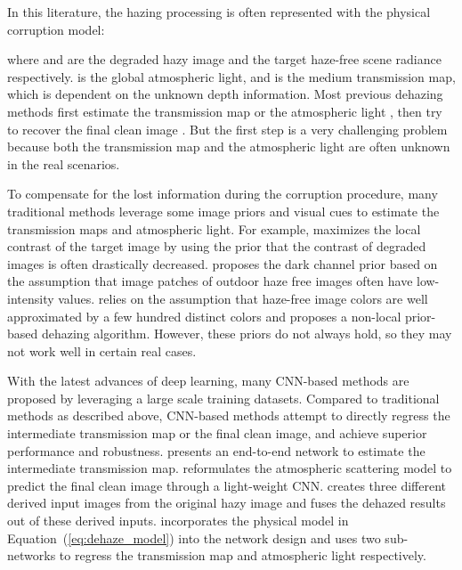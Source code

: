 \documentclass[10pt,twocolumn,letterpaper]{article}
\newcommand{\Eref}[1]{Equation~(\ref{#1})}
\begin{document}
In this literature, the hazing processing is often represented with the physical corruption model:

where  and  are the degraded hazy image and the target haze-free scene radiance respectively.  is the global atmospheric light, and  is the medium transmission map, which is dependent on the unknown depth information. Most previous dehazing methods first estimate the transmission map  or the atmospheric light ,  then try to recover the final clean image . But the first step is a very challenging problem because both the transmission map  and the atmospheric light  are often unknown in the real scenarios. 

To compensate for the lost information during the corruption procedure, many traditional methods \cite{berman2016non,hautiere2007towards,he2011single,meng2013efficient,pei2012nighttime,zhu2015fast} leverage some image priors and visual cues to estimate the transmission maps and atmospheric light. For example, \cite{hautiere2007towards} maximizes the local contrast of the target image by using the prior that the contrast of degraded images is often drastically decreased. \cite{he2011single} proposes the dark channel prior based on the assumption that image patches of outdoor haze free images often have low-intensity values. \cite{berman2016non} relies on the assumption that haze-free image colors are well approximated by a few hundred distinct colors and proposes a non-local prior-based dehazing algorithm. However, these priors do not always hold, so they may not work well in certain real cases.

With the latest advances of deep learning, many CNN-based methods \cite{ancuti2013single,cai2016dehazenet,ren2016single,li2017aod,ren2018gated,zhang2018densely} are proposed by leveraging a large scale training datasets. Compared to traditional methods as described above, CNN-based methods attempt to directly regress the intermediate transmission map or the final clean image, and achieve superior performance and robustness. \cite{cai2016dehazenet} presents an end-to-end network to estimate the intermediate transmission map. \cite{li2017aod} reformulates the atmospheric scattering model to predict the final clean image through a light-weight CNN. \cite{ren2018gated} creates three different derived input images from the original hazy image and fuses the dehazed results out of these derived inputs. \cite{zhang2018densely} incorporates the physical model in \Eref{eq:dehaze_model} into the network design and uses two sub-networks to regress the transmission map and atmospheric light respectively.
\end{document}
